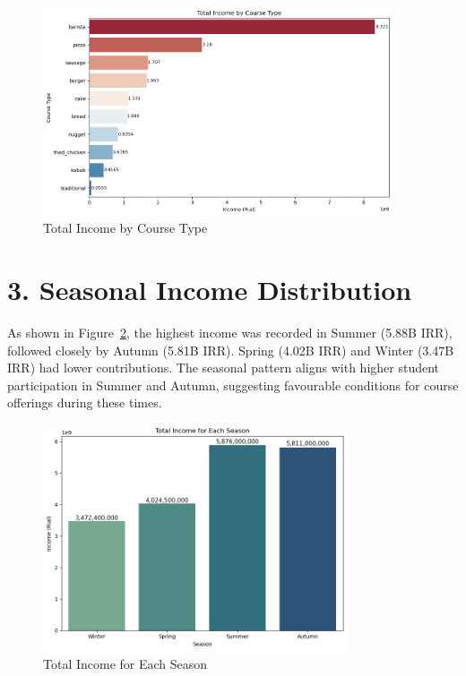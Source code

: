 \documentclass[12pt,a4paper]{article}
\begin{document}
\begin{figure}[h!]
    \centering
    \includegraphics[width=0.92\textwidth]{Total Income by Course Type.png}
    \caption{Total Income by Course Type}
    \label{fig:income-by-course-type}
\end{figure}

\section*{3. Seasonal Income Distribution}

As shown in Figure~\ref{fig:income-by-season}, the highest income was recorded in Summer (5.88B IRR), followed closely by Autumn (5.81B IRR). Spring (4.02B IRR) and Winter (3.47B IRR) had lower contributions. The seasonal pattern aligns with higher student participation in Summer and Autumn, suggesting favourable conditions for course offerings during these times.

\begin{figure}[h!]
    \centering
    \includegraphics[width=0.8\textwidth]{Total Income for Each Season.png}
    \caption{Total Income for Each Season}
    \label{fig:income-by-season}
\end{figure}
\end{document}
